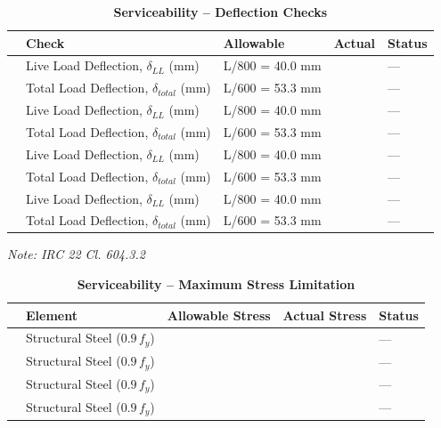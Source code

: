 \documentclass[12pt,a4paper]{report}
\numberwithin{table}{chapter}
\numberwithin{figure}{chapter}
\begin{document}
\vspace{1em}
\begin{longtable}{|C{2.5cm}|L{3.5cm}|C{3.5cm}|>{\centering\arraybackslash}p{3.5cm}|C{2.5cm}|}
\caption{\textbf{Serviceability -- Deflection Checks}}
\hline
\textbf{} & \textbf{Check} & \textbf{Allowable} & \textbf{Actual} & \textbf{Status} \\[6pt]
\hline
{} & Live Load Deflection, $\delta_{LL}$ (mm) & L/800 = 40.0 mm &  & --- \\[6pt]
 & Total Load Deflection, $\delta_{total}$ (mm) & L/600 = 53.3 mm &  & --- \\[6pt]
\hline
{} & Live Load Deflection, $\delta_{LL}$ (mm) & L/800 = 40.0 mm &  & --- \\[6pt]
 & Total Load Deflection, $\delta_{total}$ (mm) & L/600 = 53.3 mm &  & --- \\[6pt]
\hline
{} & Live Load Deflection, $\delta_{LL}$ (mm) & L/800 = 40.0 mm &  & --- \\[6pt]
 & Total Load Deflection, $\delta_{total}$ (mm) & L/600 = 53.3 mm &  & --- \\[6pt]
\hline
{} & Live Load Deflection, $\delta_{LL}$ (mm) & L/800 = 40.0 mm &  & --- \\[6pt]
 & Total Load Deflection, $\delta_{total}$ (mm) & L/600 = 53.3 mm &  & --- \\[6pt]
\hline
\end{longtable}
\noindent\textit{Note: IRC 22 Cl. 604.3.2}

\vspace{1em}
\begin{longtable}{|C{2.5cm}|L{3.5cm}|C{3.5cm}|>{\centering\arraybackslash}p{3.5cm}|C{2.5cm}|}
\caption{\textbf{Serviceability -- Maximum Stress Limitation}}
\hline
\textbf{} & \textbf{Element} & \textbf{Allowable Stress} & \textbf{Actual Stress} & \textbf{Status} \\[6pt]
\hline
\makecell{} & Structural Steel ($0.9\,f_y$) &  &  & --- \\[6pt]
\hline
\makecell{} & Structural Steel ($0.9\,f_y$) &  &  & --- \\[6pt]
\hline
\makecell{} & Structural Steel ($0.9\,f_y$) &  &  & --- \\[6pt]
\hline
\makecell{} & Structural Steel ($0.9\,f_y$) &  &  & --- \\[6pt]
\hline
\end{longtable}
\end{document}
